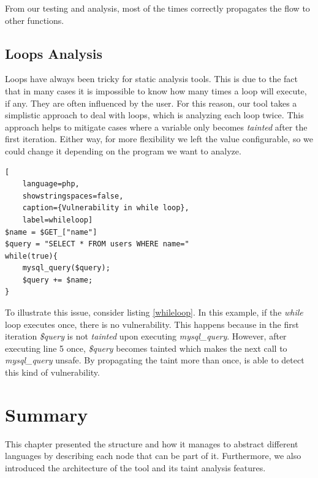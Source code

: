 From our testing and analysis, most of the times \toolname{} correctly propagates the flow to other functions.


\subsection{Loops Analysis}
\label{loops}
Loops have always been tricky for static analysis tools. This is due to the fact that in many cases it is impossible to know how many times a loop will execute, if any. They are often influenced by the user. For this reason, our tool takes a simplistic approach to deal with loops, which is analyzing each loop twice. This approach helps to mitigate cases where a variable only becomes \textit{tainted} after the first iteration. Either way, for more flexibility we left the value configurable, so we could change it depending on the program we want to analyze. 


\begin{lstlisting}[
    language=php,
    showstringspaces=false,
    caption={Vulnerability in while loop},
    label=whileloop] 
$name = $GET_["name"]    
$query = "SELECT * FROM users WHERE name=" 
while(true){
    mysql_query($query);
    $query += $name;
}
\end{lstlisting}

To illustrate this issue, consider listing \ref{whileloop}. In this example, if the \textit{while} loop executes once, there is no vulnerability. This happens because in the first iteration \textit{\$query} is not \textit{tainted} upon executing \textit{mysql\_query}. However, after executing line 5 once, \textit{\$query} becomes tainted which makes the next call to \textit{mysql\_query} unsafe. By propagating the taint more than once, \toolname{} is able to detect this kind of vulnerability.




\section{Summary}
This chapter presented the \astname{} structure and how it manages to abstract different languages by describing each node that can be part of it. Furthermore, we also introduced the architecture of the \toolname{} tool and its taint analysis features.



